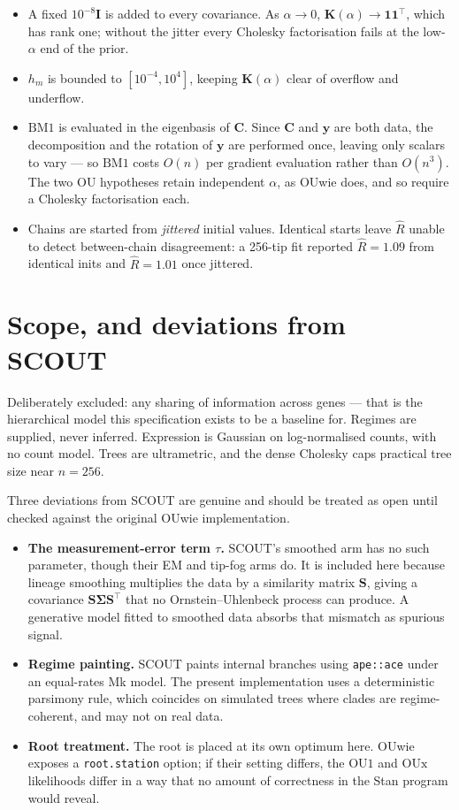 \documentclass[11pt]{article}
\newcommand{\yv}{\mathbf{y}}
\newcommand{\Cm}{\mathbf{C}}
\newcommand{\Idm}{\mathbf{I}}
\newcommand{\Km}{\mathbf{K}}
\newcommand{\one}{\mathbf{1}}
\newcommand{\Sig}{\boldsymbol{\Sigma}}
\newcommand{\BM}{\mathrm{BM1}}
\newcommand{\OUo}{\mathrm{OU1}}
\newcommand{\OUx}{\mathrm{OUx}}
\begin{document}
\begin{itemize}
  \item A fixed $10^{-8}\Idm$ is added to every covariance. As $\alpha \to 0$, $\Km(\alpha) \to \one\one^{\top}$,
    which has rank one; without the jitter every Cholesky factorisation fails at the low-$\alpha$ end
    of the prior.
  \item $h_{m}$ is bounded to $[10^{-4}, 10^{4}]$, keeping $\Km(\alpha)$ clear of overflow and underflow.
  \item $\BM$ is evaluated in the eigenbasis of $\Cm$. Since $\Cm$ and $\yv$ are both data, the
    decomposition and the rotation of $\yv$ are performed once, leaving only scalars to vary --- so
    $\BM$ costs $O(n)$ per gradient evaluation rather than $O(n^{3})$. The two OU hypotheses retain
    independent $\alpha$, as OUwie does, and so require a Cholesky factorisation each.
  \item Chains are started from \emph{jittered} initial values. Identical starts leave $\hat{R}$
    unable to detect between-chain disagreement: a 256-tip fit reported $\hat{R} = 1.09$ from
    identical inits and $\hat{R} = 1.01$ once jittered.
\end{itemize}

\section{Scope, and deviations from SCOUT}

Deliberately excluded: any sharing of information across genes --- that is the hierarchical model
this specification exists to be a baseline for. Regimes are supplied, never inferred. Expression is
Gaussian on log-normalised counts, with no count model. Trees are ultrametric, and the dense Cholesky
caps practical tree size near $n = 256$.

Three deviations from SCOUT are genuine and should be treated as open until checked against the
original OUwie implementation.

\begin{itemize}
  \item \textbf{The measurement-error term $\tau$.} SCOUT's smoothed arm has no such parameter,
    though their EM and tip-fog arms do. It is included here because lineage smoothing multiplies the
    data by a similarity matrix $\mathbf{S}$, giving a covariance $\mathbf{S}\Sig\mathbf{S}^{\top}$
    that no Ornstein--Uhlenbeck process can produce. A generative model fitted to smoothed data
    absorbs that mismatch as spurious signal.
  \item \textbf{Regime painting.} SCOUT paints internal branches using \texttt{ape::ace} under an
    equal-rates Mk model. The present implementation uses a deterministic parsimony rule, which
    coincides on simulated trees where clades are regime-coherent, and may not on real data.
  \item \textbf{Root treatment.} The root is placed at its own optimum here. OUwie exposes a
    \texttt{root.station} option; if their setting differs, the $\OUo$ and $\OUx$ likelihoods differ
    in a way that no amount of correctness in the Stan program would reveal.
\end{itemize}
\end{document}
